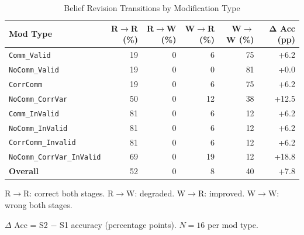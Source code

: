 \begin{table}[h]
\centering
\caption{Belief Revision Transitions by Modification Type}
\label{tab:transitions}
\begin{tabular}{lrrrrr}
\toprule
\textbf{Mod Type} & \textbf{R$\to$R (\%)} & \textbf{R$\to$W (\%)} & \textbf{W$\to$R (\%)} & \textbf{W$\to$W (\%)} & $\boldsymbol{\Delta}$ \textbf{Acc (pp)} \\
\midrule
\texttt{Comm\_Valid} & 19 & 0 & 6 & 75 & +6.2 \\
\texttt{NoComm\_Valid} & 19 & 0 & 0 & 81 & +0.0 \\
\texttt{CorrComm} & 19 & 0 & 6 & 75 & +6.2 \\
\texttt{NoComm\_CorrVar} & 50 & 0 & 12 & 38 & +12.5 \\
\texttt{Comm\_InValid} & 81 & 0 & 6 & 12 & +6.2 \\
\texttt{NoComm\_InValid} & 81 & 0 & 6 & 12 & +6.2 \\
\texttt{CorrComm\_Invalid} & 81 & 0 & 6 & 12 & +6.2 \\
\texttt{NoComm\_CorrVar\_InValid} & 69 & 0 & 19 & 12 & +18.8 \\
\midrule
\textbf{Overall} & 52 & 0 & 8 & 40 & +7.8 \\
\bottomrule
\end{tabular}
\begin{tablenotes}
\small
\item R$\to$R: correct both stages. R$\to$W: degraded. W$\to$R: improved. W$\to$W: wrong both stages.
\item $\Delta$ Acc = S2 $-$ S1 accuracy (percentage points). $N=16$ per mod type.
\end{tablenotes}
\end{table}